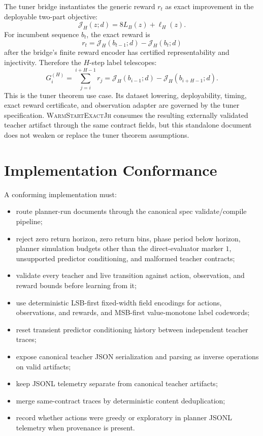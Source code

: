 \documentclass[11pt]{article}
\newcommand{\Warm}{\textnormal{\textsc{WarmStartExactJh}}}
\newcommand{\Jh}{\mathcal{J}_H}
\begin{document}
The tuner bridge instantiates the generic reward \(r_t\) as exact improvement
in the deployable two-part objective:
\[
\Jh(z;d)=8L_B(z)+\ell_H(z).
\]
For incumbent sequence \(b_t\), the exact reward is
\[
r_t=\Jh(b_{t-1};d)-\Jh(b_t;d)
\]
after the bridge's finite reward encoder has certified representability and
injectivity. Therefore the \(H\)-step label telescopes:
\[
G_i^{(H)}
=\sum_{j=i}^{i+H-1}r_j
=\Jh(b_{i-1};d)-\Jh(b_{i+H-1};d).
\]
This is the tuner theorem use case. Its dataset lowering, deployability,
timing, exact reward certificate, and observation adapter are governed by the
tuner specification. \Warm{} consumes the resulting externally validated
teacher artifact through the same contract fields, but this standalone
document does not weaken or replace the tuner theorem assumptions.

\section{Implementation Conformance}
\label{sec:implementation}

A conforming implementation must:
\begin{itemize}
    \item route planner-run documents through the canonical spec
    validate/compile pipeline;
    \item reject zero return horizon, zero return bins, phase period below
    horizon, planner simulation budgets other than the direct-evaluator marker
    \(1\), unsupported predictor conditioning, and malformed teacher contracts;
    \item validate every teacher and live transition against action,
    observation, and reward bounds before learning from it;
    \item use deterministic LSB-first fixed-width field encodings for actions,
    observations, and rewards, and MSB-first value-monotone label codewords;
    \item reset transient predictor conditioning history between independent
    teacher traces;
    \item expose canonical teacher JSON serialization and parsing as inverse
    operations on valid artifacts;
    \item keep JSONL telemetry separate from canonical teacher artifacts;
    \item merge same-contract traces by deterministic content deduplication;
    \item record whether actions were greedy or exploratory in planner JSONL
    telemetry when provenance is present.
\end{itemize}
\end{document}
